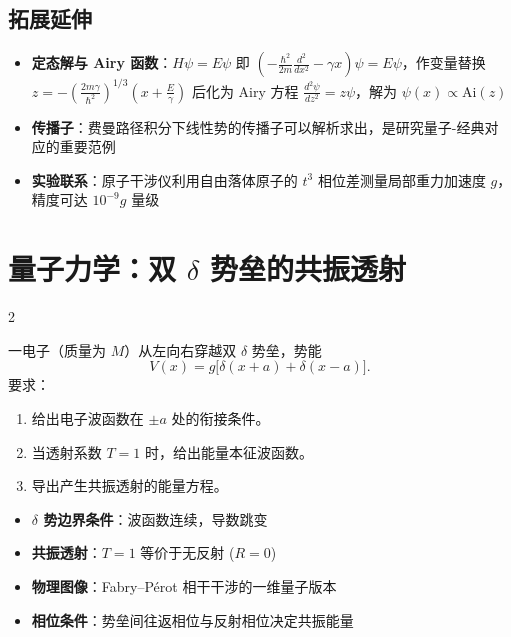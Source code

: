 \subsection{拓展延伸}

\begin{itemize}
    \item \textbf{定态解与 Airy 函数}：$H\psi = E\psi$ 即 $(-\frac{\hbar^2}{2m}\frac{d^2}{dx^2} - \gamma x)\psi = E\psi$，作变量替换 $z = -(\frac{2m\gamma}{\hbar^2})^{1/3}(x + \frac{E}{\gamma})$ 后化为 Airy 方程 $\frac{d^2\psi}{dz^2} = z \psi$，解为 $\psi(x) \propto \text{Ai}(z)$
    \item \textbf{传播子}：费曼路径积分下线性势的传播子可以解析求出，是研究量子-经典对应的重要范例
    \item \textbf{实验联系}：原子干涉仪利用自由落体原子的 $t^3$ 相位差测量局部重力加速度 $g$，精度可达 $10^{-9} g$ 量级
\end{itemize}


\newpage
\section{量子力学：双 $\delta$ 势垒的共振透射}
\label{sec:double-delta}

\begin{multicols}{2}

\begin{modelbox}
一电子（质量为 $M$）从左向右穿越双 $\delta$ 势垒，势能
\[
V(x) = g\bigl[\delta(x+a) + \delta(x-a)\bigr].
\]
要求：
\begin{enumerate}[nosep]
    \item 给出电子波函数在 $\pm a$ 处的衔接条件。
    \item 当透射系数 $T=1$ 时，给出能量本征波函数。
    \item 导出产生共振透射的能量方程。
\end{enumerate}
\end{modelbox}

\begin{tipbox}[考点快速分析]
\begin{itemize}
    \item \textbf{$\delta$ 势边界条件}：波函数连续，导数跳变
    \item \textbf{共振透射}：$T=1$ 等价于无反射 ($R=0$)
    \item \textbf{物理图像}：Fabry--P\'erot 相干干涉的一维量子版本
    \item \textbf{相位条件}：势垒间往返相位与反射相位决定共振能量
\end{itemize}
\end{tipbox}

\end{multicols}

